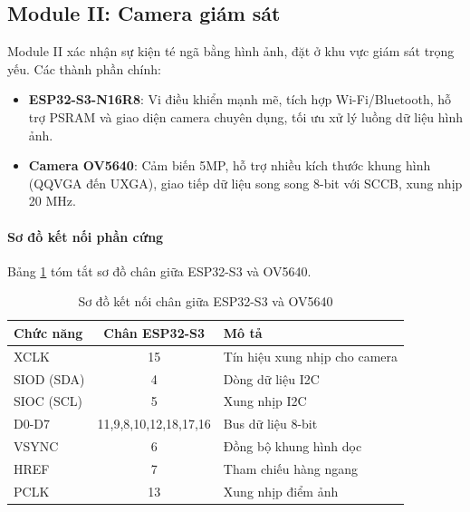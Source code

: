 \subsection{Module II: Camera giám sát}
\label{ssec:module_two}

Module II xác nhận sự kiện té ngã bằng hình ảnh, đặt ở khu vực giám sát trọng yếu. Các thành phần chính:

\begin{itemize}
    \item \textbf{ESP32-S3-N16R8}: Vi điều khiển mạnh mẽ, tích hợp Wi-Fi/Bluetooth, hỗ trợ PSRAM và giao diện camera chuyên dụng, tối ưu xử lý luồng dữ liệu hình ảnh.
    \item \textbf{Camera OV5640}: Cảm biến 5MP, hỗ trợ nhiều kích thước khung hình (QQVGA đến UXGA), giao tiếp dữ liệu song song 8-bit với SCCB, xung nhịp 20 MHz.
\end{itemize}

\paragraph{Sơ đồ kết nối phần cứng}
Bảng \ref{tab:pin_mapping} tóm tắt sơ đồ chân giữa ESP32-S3 và OV5640.

\begin{table}[H]
    \centering
    \caption{Sơ đồ kết nối chân giữa ESP32-S3 và OV5640}
    \label{tab:pin_mapping}
    \begin{tabular}{|l|c|l|}
    \hline
    \textbf{Chức năng} & \textbf{Chân ESP32-S3} & \textbf{Mô tả} \\
    \hline
    XCLK & 15 & Tín hiệu xung nhịp cho camera \\
    SIOD (SDA) & 4 & Dòng dữ liệu I2C \\
    SIOC (SCL) & 5 & Xung nhịp I2C \\
    D0-D7 & 11,9,8,10,12,18,17,16 & Bus dữ liệu 8-bit \\
    VSYNC & 6 & Đồng bộ khung hình dọc \\
    HREF & 7 & Tham chiếu hàng ngang \\
    PCLK & 13 & Xung nhịp điểm ảnh \\
    \hline
    \end{tabular}
\end{table}

